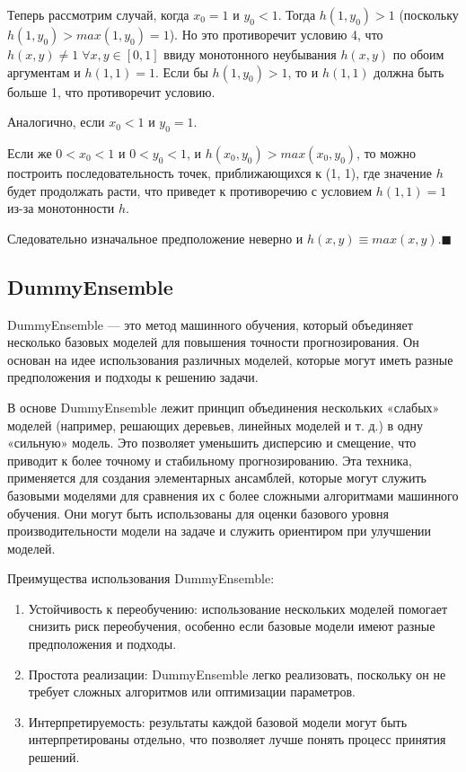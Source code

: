 Теперь рассмотрим случай, когда $x_0 = 1$ и $y_0 < 1$.  Тогда $h(1, y_0) > 1$  (поскольку $h(1,y_0) > max(1, y_0) = 1$). Но это противоречит условию 4, что $h(x,y) \neq 1 \; \forall x, y \in [0, 1]$ ввиду монотонного неубывания $h(x,y)$ по обоим аргументам и $h(1,1) = 1$.  Если бы $h(1, y_0) > 1$, то и $h(1,1)$ должна быть больше 1, что противоречит условию.

Аналогично, если  $x_0 < 1$ и $y_0 = 1$.

Если же $0 < x_0 < 1$ и $0 < y_0 < 1$, и  $h(x_0, y_0) > max(x_0, y_0)$, то можно построить последовательность точек, приближающихся к (1, 1),  где значение $h$ будет продолжать расти, что приведет к противоречию с условием $h(1, 1) = 1$ из-за монотонности $h$.

Следовательно изначальное предположение неверно и $h(x,y)\equiv max(x,y).\blacksquare$

\subsection{DummyEnsemble}
DummyEnsemble — это метод машинного обучения, который объединяет несколько базовых моделей для повышения точности прогнозирования. Он основан на идее использования различных моделей, которые могут иметь разные предположения и подходы к решению задачи.

В основе DummyEnsemble лежит принцип объединения нескольких «слабых» моделей (например, решающих деревьев, линейных моделей и т. д.) в одну «сильную» модель. Это позволяет уменьшить дисперсию и смещение, что приводит к более точному и стабильному прогнозированию. Эта техника, применяется для создания элементарных ансамблей, которые могут служить базовыми моделями для сравнения их с более сложными алгоритмами машинного обучения. Они могут быть использованы для оценки базового уровня производительности модели на задаче и служить ориентиром при улучшении моделей.

Преимущества использования DummyEnsemble:
\begin{enumerate}
	\item Устойчивость к переобучению: использование нескольких моделей помогает снизить риск переобучения, особенно если базовые модели имеют разные предположения и подходы.
	\item Простота реализации: DummyEnsemble легко реализовать, поскольку он не требует сложных алгоритмов или оптимизации параметров.
	\item Интерпретируемость: результаты каждой базовой модели могут быть интерпретированы отдельно, что позволяет лучше понять процесс принятия решений.
\end{enumerate}

